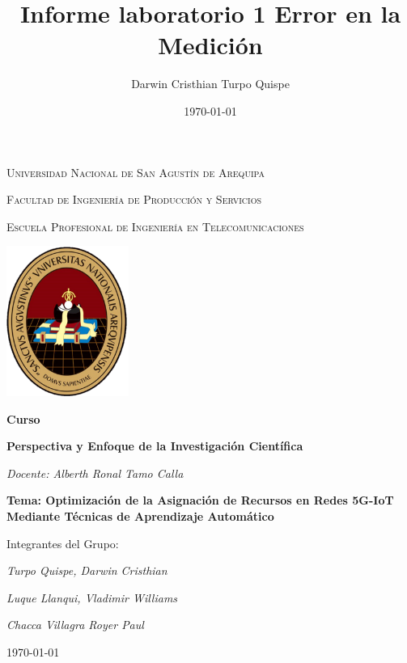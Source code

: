 \documentclass[12pt,a4paper]{article}
\title{\textbf{Informe laboratorio 1 Error en la Medición}}
\author{Darwin Cristhian Turpo Quispe}
\date{\today}
\begin{document}
\begin{titlepage}
  \centering
  {\scshape\LARGE Universidad Nacional de San Agustín de Arequipa\par}
  {\scshape\Large Facultad de Ingeniería de Producción y Servicios\par}
  {\scshape\Large Escuela Profesional de Ingeniería en Telecomunicaciones \par}
  \vspace{1cm}
  \includegraphics[width=0.3\textwidth]{Escudo_UNSA.png}\par\vspace{1cm}
  
  \vspace{0.5cm}
  {\Large\bfseries Curso \par}
  {\Large\bfseries Perspectiva y Enfoque de la Investigación Científica \par}
  \vspace{0.5cm}
  {\Large\itshape Docente: Alberth Ronal Tamo Calla\par}
  \vspace{0.5cm}
  \vspace{0.5cm}
  {\Large\bfseries Tema: Optimización de la Asignación de Recursos en Redes 5G-IoT Mediante Técnicas de Aprendizaje Automático \par}
  \vspace{1cm}
  Integrantes del Grupo:\par
  \vspace{0.5cm}
  {\Large\itshape Turpo Quispe, Darwin Cristhian \par}
  {\Large\itshape Luque Llanqui, Vladimir Williams \par}
  {\Large\itshape Chacca Villagra Royer Paul \par}
  \vspace{1cm}
  {\large \today \par}
\end{titlepage}
\end{document}
